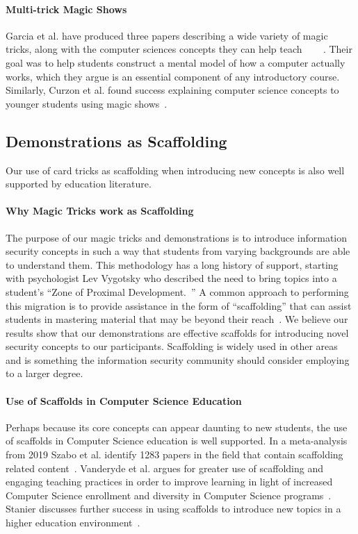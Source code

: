 \paragraph{Multi-trick Magic Shows}
Garcia et al. have produced three papers describing a wide variety of magic
tricks, along with the computer sciences concepts they can help
teach~\cite{garcia2012demystifying}
~\cite{garcia2013demystifying}
~\cite{garcia2016demystifying}.
Their goal was to help students construct a mental model of how a computer
actually works, which they argue is an essential component of any introductory
course.
Similarly, Curzon et al. found success explaining computer
science concepts to younger students using magic shows~\cite{Curzon2008}.

\subsection{Demonstrations as Scaffolding}
\label{sec:demosasscaffolding}

Our use of card tricks as scaffolding when introducing new concepts is also well
supported by education literature.

\paragraph{Why Magic Tricks work as Scaffolding}
The purpose of our magic tricks and demonstrations is to introduce
information security concepts in such a way that students from varying
backgrounds are able to understand them.  This methodology has a long history of
support, starting with psychologist Lev Vygotsky
who described the need to bring topics into a
student's ``Zone of Proximal Development.~\cite{vygotsky1978}''
A common approach to performing this migration is to provide assistance in the
form of ``scaffolding'' that can assist students in mastering material that may
be beyond their reach~\cite{wood1976role}.  We believe our results show that our
demonstrations are effective scaffolds for introducing novel security concepts
to our participants.  Scaffolding is widely used in other areas and is something
the information security community should consider employing to a larger degree.

\paragraph{Use of Scaffolds in Computer Science Education}
Perhaps because its core concepts can appear daunting to new students,
the use of scaffolds in Computer Science education is well supported. In a
meta-analysis from 2019 Szabo et
al. identify 1283 papers in the field that contain scaffolding related
content~\cite{szabometa}.
Vanderyde et al. argues for greater use of scaffolding and
engaging teaching practices in order to improve learning in light of increased
Computer Science enrollment and diversity in Computer Science
programs~\cite{vanderhydescaffolding}.  Stanier discusses further success in
using scaffolds to introduce new topics in a higher education
environment~\cite{stanierhighered}.
